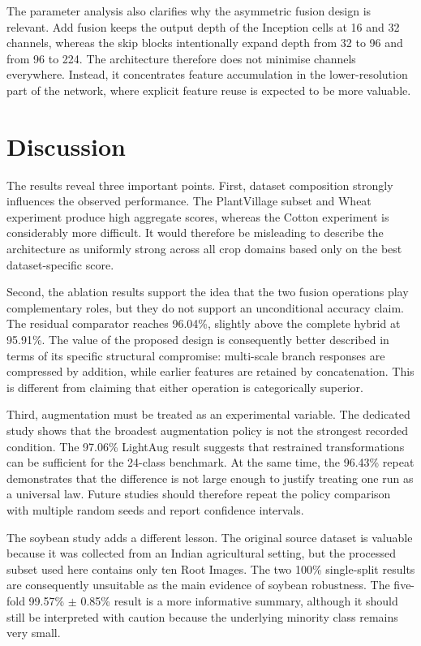 \documentclass[a4paper,fleqn]{cas-dc}
\begin{document}
The parameter analysis also clarifies why the asymmetric fusion design is relevant. Add fusion keeps the output depth of the Inception cells at 16 and 32 channels, whereas the skip blocks intentionally expand depth from 32 to 96 and from 96 to 224. The architecture therefore does not minimise channels everywhere. Instead, it concentrates feature accumulation in the lower-resolution part of the network, where explicit feature reuse is expected to be more valuable.

\section{Discussion}
The results reveal three important points. First, dataset composition strongly influences the observed performance. The PlantVillage subset and Wheat experiment produce high aggregate scores, whereas the Cotton experiment is considerably more difficult. It would therefore be misleading to describe the architecture as uniformly strong across all crop domains based only on the best dataset-specific score.

Second, the ablation results support the idea that the two fusion operations play complementary roles, but they do not support an unconditional accuracy claim. The residual comparator reaches 96.04\%, slightly above the complete hybrid at 95.91\%. The value of the proposed design is consequently better described in terms of its specific structural compromise: multi-scale branch responses are compressed by addition, while earlier features are retained by concatenation. This is different from claiming that either operation is categorically superior.

Third, augmentation must be treated as an experimental variable. The dedicated study shows that the broadest augmentation policy is not the strongest recorded condition. The 97.06\% LightAug result suggests that restrained transformations can be sufficient for the 24-class benchmark. At the same time, the 96.43\% repeat demonstrates that the difference is not large enough to justify treating one run as a universal law. Future studies should therefore repeat the policy comparison with multiple random seeds and report confidence intervals.

The soybean study adds a different lesson. The original source dataset is valuable because it was collected from an Indian agricultural setting, but the processed subset used here contains only ten Root Images. The two 100\% single-split results are consequently unsuitable as the main evidence of soybean robustness. The five-fold 99.57\% $\pm$ 0.85\% result is a more informative summary, although it should still be interpreted with caution because the underlying minority class remains very small.
\end{document}
